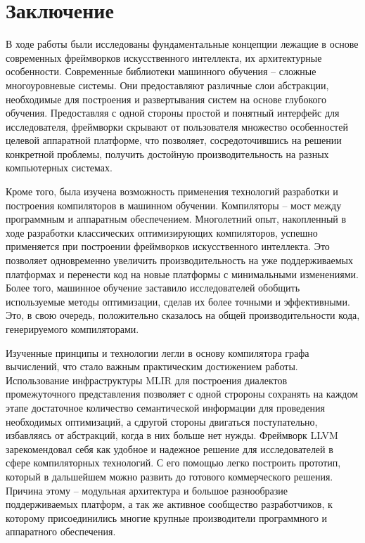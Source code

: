 \clearpage
\section{Заключение}

В ходе работы были исследованы фундаментальные концепции лежащие в основе
современных фреймворков искусственного интеллекта, их архитектурные особенности.
Современные библиотеки машинного обучения -- сложные многоуровневые системы.
Они предоставляют различные слои абстракции, необходимые для построения и
развертывания систем на основе глубокого обучения. Предоставляя с одной стороны
простой и понятный интерфейс для исследователя, фреймворки скрывают от пользователя
множество особенностей целевой аппаратной платформе, что позволяет, сосредоточившись
на решении конкретной проблемы, получить достойную производительность на разных
компьютерных системах.

Кроме того, была изучена возможность применения технологий разработки и
построения компиляторов в машинном обучении. Компиляторы -- мост между
программным и аппаратным обеспечением. Многолетний опыт, накопленный в ходе
разработки классических оптимизирующих компиляторов, успешно применяется при
построении фреймворков искусственного интеллекта. Это позволяет одновременно
увеличить производительность на уже поддерживаемых платформах и перенести код
на новые платформы с минимальными изменениями. Более того, машинное обучение
заставило исследователей обобщить используемые методы оптимизации, сделав
их более точными и эффективными. Это, в свою очередь, положительно сказалось
на общей производительности кода, генерируемого компиляторами.

Изученные принципы и технологии легли в основу компилятора графа вычислений, что
стало важным практическим достижением работы. Использование инфраструктуры MLIR 
для построения диалектов промежуточного представления позволяет с одной стророны
сохранять на каждом этапе достаточное количество семантической информации для
проведения необходимых оптимизаций, а сдругой стороны двигаться поступательно,
избавляясь от абстракций, когда в них больше нет нужды. Фреймворк LLVM
зарекомендовал себя как удобное и надежное решение для исследователей в сфере
компиляторных технологий. С его помощью легко построить прототип, который в
дальшейшем можно развить до готового коммерческого решения. Причина этому --
модульная архитектура и большое разнообразие поддерживаемых платформ, а так же
активное сообщество разработчиков, к которому присоединились многие крупные
производители программного и аппаратного обеспечения.

